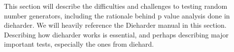 This section will describe the difficulties and challenges to testing random number generators, including the rationale behind p value analysis done in dieharder. We will heavily reference the Dieharder manual in this section. Describing how dieharder works is essential, and perhaps describing major important tests, especially the ones from diehard.

